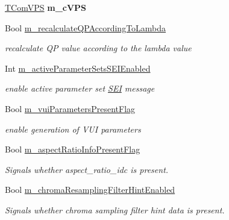 \begin{DoxyCompactItemize}
\hyperlink{class_t_com_v_p_s}{T\+Com\+V\+PS} {\bfseries m\+\_\+c\+V\+PS}
\item 
\mbox{\label{class_t_enc_cfg_aaf0a9238df100fd37be509d0cc785abe}} 
Bool \hyperlink{class_t_enc_cfg_aaf0a9238df100fd37be509d0cc785abe}{m\+\_\+recalculate\+Q\+P\+According\+To\+Lambda}
\begin{DoxyCompactList}\small\item\em recalculate QP value according to the lambda value \end{DoxyCompactList}\item 
\mbox{\label{class_t_enc_cfg_a9cc3146b4acc1d50ad191cd82dd295ac}} 
Int \hyperlink{class_t_enc_cfg_a9cc3146b4acc1d50ad191cd82dd295ac}{m\+\_\+active\+Parameter\+Sets\+S\+E\+I\+Enabled}
\begin{DoxyCompactList}\small\item\em enable active parameter set \hyperlink{class_s_e_i}{S\+EI} message \end{DoxyCompactList}\item 
\mbox{\label{class_t_enc_cfg_a6900751ccda059632023991c25acad93}} 
Bool \hyperlink{class_t_enc_cfg_a6900751ccda059632023991c25acad93}{m\+\_\+vui\+Parameters\+Present\+Flag}
\begin{DoxyCompactList}\small\item\em enable generation of V\+UI parameters \end{DoxyCompactList}\item 
\mbox{\label{class_t_enc_cfg_aa1603e1a3bf2e801ac3696dcbc3edf12}} 
Bool \hyperlink{class_t_enc_cfg_aa1603e1a3bf2e801ac3696dcbc3edf12}{m\+\_\+aspect\+Ratio\+Info\+Present\+Flag}
\begin{DoxyCompactList}\small\item\em Signals whether aspect\+\_\+ratio\+\_\+idc is present. \end{DoxyCompactList}\item 
\mbox{\label{class_t_enc_cfg_a172bac695abf0e6b0132611d162f6e2c}} 
Bool \hyperlink{class_t_enc_cfg_a172bac695abf0e6b0132611d162f6e2c}{m\+\_\+chroma\+Resampling\+Filter\+Hint\+Enabled}
\begin{DoxyCompactList}\small\item\em Signals whether chroma sampling filter hint data is present. \end{DoxyCompactList}\item 

\end{DoxyCompactItemize}
